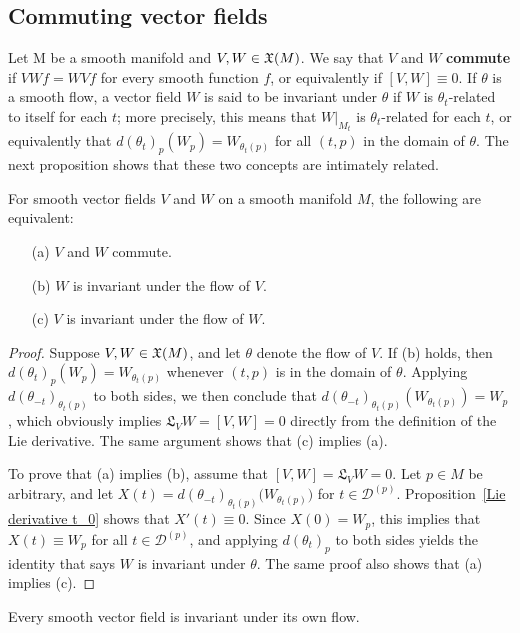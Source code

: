 \subsection{Commuting vector fields}
Let M be a smooth manifold and $V,W\in\mathfrak{X}(M)$. We say that $V$ and $W$ \textbf{commute} if $VWf=WVf$ for every smooth function $f$, or equivalently if $[V,W]\equiv0$. If $\theta$ is a smooth flow, a vector field $W$ is said to be invariant under $\theta$ if $W$ is $\theta_t$-related to itself for each $t$; more precisely, this means that $W|_{M_t}$ is $\theta_t$-related for each $t$, or equivalently that $d(\theta_t)_p(W_p)=W_{\theta_t(p)}$ for all $(t,p)$ in the domain of $\theta$. The next proposition shows that these two concepts are intimately related.
\begin{theorem}\label{vector field commute iff}
For smooth vector fields $V$ and $W$ on a smooth manifold $M$, the following are equivalent:
\begin{itemize}
\item[(a)] $V$ and $W$ commute.
\item[(b)] $W$ is invariant under the flow of $V$.
\item[(c)] $V$ is invariant under the flow of $W$.
\end{itemize}
\end{theorem}
\begin{proof}
Suppose $V,W\in\mathfrak{X}(M)$, and let $\theta$ denote the flow of $V$. If (b) holds, then $d(\theta_t)_p(W_p)=W_{\theta_t(p)}$ whenever $(t,p)$ is in the domain of $\theta$. Applying $d(\theta_{-t})_{\theta_t(p)}$ to both sides, we then conclude that $d(\theta_{-t})_{\theta_t(p)}(W_{\theta_t(p)})=W_p$, which obviously implies $\mathfrak{L}_VW=[V,W]=0$ directly from the definition of the Lie derivative. The same argument shows that (c) implies (a).\par
To prove that (a) implies (b), assume that $[V,W]=\mathfrak{L}_VW=0$. Let $p\in M$ be arbitrary, and let $X(t)=d(\theta_{-t})_{\theta_t(p)}\big(W_{\theta_t(p)}\big)$ for $t\in\mathcal{D}^{(p)}$. Proposition~\ref{Lie derivative t_0} shows that $X'(t)\equiv 0$. Since $X(0)=W_p$, this implies that $X(t)\equiv W_p$ for all $t\in\mathcal{D}^{(p)}$, and applying $d(\theta_t)_p$ to both sides yields the identity that says $W$ is invariant under $\theta$. The same proof also shows that (a) implies (c).
\end{proof}
\begin{corollary}
Every smooth vector field is invariant under its own flow.
\end{corollary}
